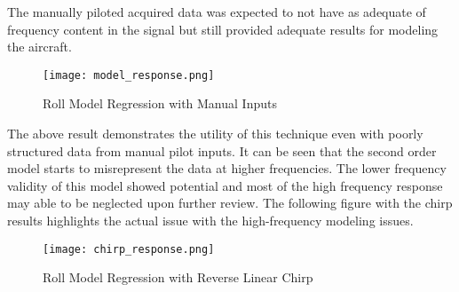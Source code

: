 The manually piloted acquired data was expected to not have as adequate of frequency content in the signal but still provided adequate results for modeling the aircraft.

\begin{figure}[!h]
 \centering
  \texttt{[image: model\_response.png]}
  \caption{Roll Model Regression with Manual Inputs}
  \label{fig:roll_model}
\end{figure}

The above result demonstrates the utility of this technique even with poorly structured data from manual pilot inputs.  It can be seen that the second order model starts to misrepresent the data at higher frequencies.  The lower frequency validity of this model showed potential and most of the high frequency response may able to be neglected upon further review.  The following figure with the chirp results highlights the actual issue with the high-frequency modeling issues.

\begin{figure}[!h]
 \centering
  \texttt{[image: chirp\_response.png]}
  \caption{Roll Model Regression with Reverse Linear Chirp}
  \label{fig:chirp_model}
\end{figure}

